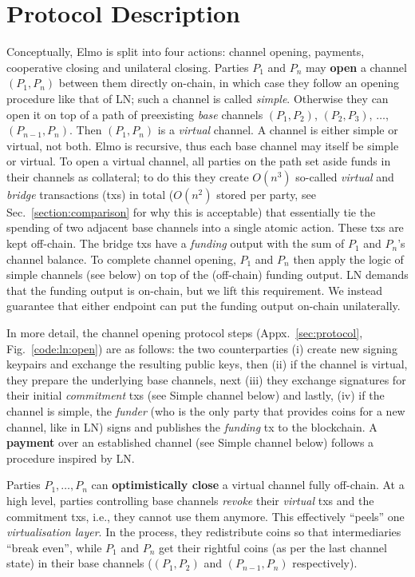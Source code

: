 \section{Protocol Description}
\label{sec:high-level}
  Conceptually, Elmo is split into four actions: channel opening,
  payments, cooperative closing and unilateral closing. Parties $P_1$ and $P_n$
  may \textbf{open} a channel $(P_1, P_n)$ between them directly on-chain, in which case
  they follow an opening procedure like that of LN; such a channel is called
  \emph{simple}.
  Otherwise they can open it on top of a path
  of preexisting \emph{base} channels $(P_1, P_2)$, $(P_2, P_3)$, $\dots$,
  $(P_{n-1}, P_{n})$. Then $(P_1, P_n)$ is a \emph{virtual}
  channel. A channel is either simple or virtual, not both. Elmo is
  recursive, thus each base channel may itself be simple or
  virtual. To open a virtual
  channel, all parties on the
  path set aside funds in their channels as
  collateral; to do this
  they create $O(n^3)$ so-called \emph{virtual} and \emph{bridge} transactions (txs) in total
  ($O(n^2)$ stored per party, see Sec.~\ref{section:comparison} for why this is acceptable) that essentially
  tie the spending of two adjacent base channels into a single atomic action.
  These txs are kept off-chain. The bridge txs
  have a \emph{funding}
  output with the sum of $P_1$ and $P_n$'s channel
  balance. To complete channel opening, $P_1$ and $P_n$ then
  apply the logic of simple channels (see below) on top of
  the (off-chain) funding output. LN demands that the funding
  output is on-chain, but we lift this requirement. We instead guarantee that
  either endpoint can put the funding output on-chain unilaterally.

  In more detail, the channel opening protocol steps
  (Appx.~\ref{sec:protocol}, Fig.~\ref{code:ln:open})
  are as follows: the two counterparties (i) create new signing keypairs and
  exchange the resulting public keys, then (ii) if the channel is
  virtual, they prepare the underlying base channels, next (iii) they exchange
  signatures for their initial \emph{commitment} txs (see Simple channel below)
  and lastly, (iv) if the channel is simple, the \emph{funder} (who is the only
  party that provides coins for a new channel, like in LN) signs and publishes
  the \emph{funding} tx to the blockchain.
  A \textbf{payment} over an established channel (see Simple channel below) follows a procedure inspired by
  LN.

  Parties $P_1, \dots, P_n$ can \textbf{optimistically close} a virtual channel
  fully off-chain. At a high
  level, parties controlling base channels \emph{revoke} their \emph{virtual}
  txs and the commitment txs, i.e., they cannot use them
  anymore. This effectively ``peels'' one \emph{virtualisation layer}.
  In the process, they redistribute coins so that intermediaries ``break even'',
  while $P_1$
  and $P_n$ get their rightful coins (as per the last channel
  state) in their base channels ($(P_1, P_2)$ and $(P_{n-1}, P_n)$ respectively).

